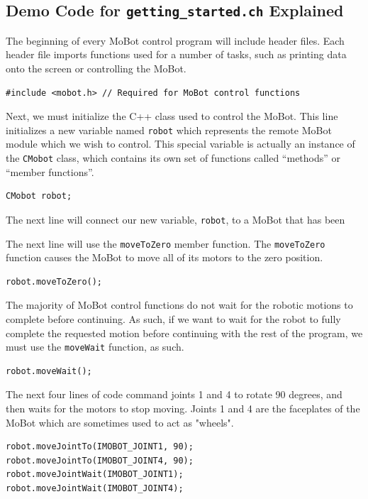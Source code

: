 \documentclass{article}
\begin{document}
\subsection{\label{sec:democode}Demo Code for \texttt{getting\_started.ch} Explained}
The beginning of every MoBot control program will include header files. Each
header file imports functions used for a number of tasks, such as printing
data onto the screen or controlling the MoBot. 

\begin{verbatim}
#include <mobot.h> // Required for MoBot control functions
\end{verbatim}

Next, we must initialize the C++ class used to control the MoBot. This line
initializes a new variable named \texttt{robot} which represents the remote
MoBot module which we wish to control. This special variable is actually an
instance of the \texttt{CMobot} class, which contains its own set of
functions called ``methods'' or ``member functions''.
\begin{verbatim}
CMobot robot;
\end{verbatim}

The next line will connect our new variable, \texttt{robot}, to a
MoBot that has been 

The next line will use the \texttt{moveToZero} member function. The
\texttt{moveToZero} function causes the MoBot to move all of its motors to the
zero position.
\begin{verbatim}
robot.moveToZero();
\end{verbatim}

The majority of MoBot control functions do not wait for the robotic motions to
complete before continuing. As such, if we want to wait for the robot to fully
complete the requested motion before continuing with the rest of the program,
we must use the \texttt{moveWait} function, as such.
\begin{verbatim}
robot.moveWait();
\end{verbatim}

The next four lines of code command joints 1 and 4 to rotate 90 degrees, and
then waits for the motors to stop moving. Joints 1 and 4 are the faceplates
of the MoBot which are sometimes used to act as "wheels".
\begin{verbatim}
robot.moveJointTo(IMOBOT_JOINT1, 90);
robot.moveJointTo(IMOBOT_JOINT4, 90);
robot.moveJointWait(IMOBOT_JOINT1);
robot.moveJointWait(IMOBOT_JOINT4);
\end{verbatim}
\end{document}
